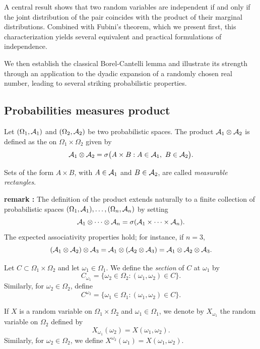 \documentclass[../Main.tex]{subfiles}
\begin{document}
A central result shows that two random variables are independent if and only if the joint distribution of the pair coincides with the product of their marginal distributions. Combined with Fubini's theorem, which we present first, this characterization yields several equivalent and practical formulations of independence.

We then establish the classical Borel-Cantelli lemma and illustrate its strength through an application to the dyadic expansion of a randomly chosen real number, leading to several striking probabilistic properties.

\subsection{Probabilities measures product}
Let $(\measspace[1])$ and $(\measspace[2])$ be two probabilistic spaces. The product \sfield $\A_1\otimes\A_2$ is defined as the \sfield on $\Omega_1\times\Omega_2$ given by
\[ \A_1\otimes\A_2 = \sigma\bigl(A\times B : A\in\A_1,\ B\in\A_2\bigr). \]

Sets of the form $A\times B$, with $A\in\A_1$ and $B\in\A_2$, are called \emph{measurable rectangles}. 

\textbf{remark :} The definition of the product \sfield extends naturally to a finite collection of probabilistic spaces $(\Omega_1,\A_1),\dots,(\Omega_n,\A_n)$ by setting
\[ \A_1\otimes\cdots\otimes\A_n = \sigma(\A_1\times\cdots\times\A_n). \]
The expected associativity properties hold; for instance, if $n=3$,
\[ (\A_1\otimes\A_2)\otimes\A_3 = \A_1\otimes(\A_2\otimes\A_3) = \A_1\otimes\A_2\otimes\A_3. \]

Let $C\subset \Omega_1\times\Omega_2$ and let $\omega_1\in\Omega_1$. We define the \emph{section} of $C$ at $\omega_1$ by
\[ C_{\omega_1} = \{\omega_2\in\Omega_2 : (\omega_1,\omega_2)\in C\}. \]
Similarly, for $\omega_2\in\Omega_2$, define
\[ C^{\omega_2} = \{\omega_1\in\Omega_1 : (\omega_1,\omega_2)\in C\}. \]

If $X$ is a random variable on $\Omega_1\times\Omega_2$ and $\omega_1\in\Omega_1$, we denote by $X_{\omega_1}$ the random variable on $\Omega_2$ defined by
\[ X_{\omega_1}(\omega_2)=X(\omega_1,\omega_2). \]
Similarly, for $\omega_2\in\Omega_2$, we define $X^{\omega_2}(\omega_1)=X(\omega_1,\omega_2)$.
\end{document}
